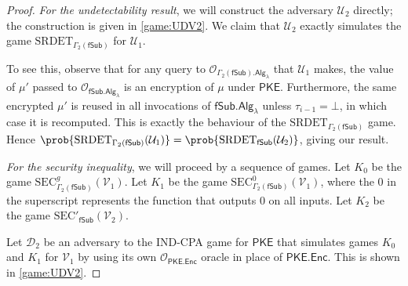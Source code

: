 \begin{proof}
\textit{For the undetectability result}, we will construct the adversary $\mathcal{U}_2$ directly; the construction is given in \autoref{game:UDV2}. We claim that $\mathcal{U}_2$ exactly simulates the game $\mathrm{SRDET}_{\Gamma_2(\mathsf{fSub})}$ for $\mathcal{U}_1$.

To see this, observe that for any query to $\mathcal{O}_{\Gamma_2(\mathsf{fSub}).\mathsf{Alg}_\lambda}$ that $\mathcal{U}_1$ makes, the value of $\mu'$ passed to $\mathcal{O}_{\mathsf{fSub.Alg}_\lambda}$ is an encryption of $\mu$ under $\mathsf{PKE}$. Furthermore, the same encrypted $\mu'$ is reused in all invocations of $\mathsf{fSub.Alg}_\lambda$ unless $\tau_{i-1}=\bot$, in which case it is recomputed. This is exactly the behaviour of the $\mathrm{SRDET}_{\Gamma_2(\mathsf{fSub})}$ game. Hence $\prob{\mathrm{SRDET}_{\Gamma_2(\mathsf{fSub})}(\mathcal{U}_1)}=\prob{\mathrm{SRDET}_{\mathsf{fSub}}(\mathcal{U}_2)}$, giving our result.

\textit{For the security inequality}, we will proceed by a sequence of games. Let $K_0$ be the game $\mathrm{SEC}^g_{\Gamma_2(\mathsf{fSub})}(\mathcal{V}_1)$. Let $K_1$ be the game $\mathrm{SEC}^0_{\Gamma_2(\mathsf{fSub})}(\mathcal{V}_1)$, where the 0 in the superscript represents the function that outputs 0 on all inputs. Let $K_2$ be the game $\mathrm{SEC'}_{\mathsf{fSub}}(\mathcal{V}_2)$.

Let $\mathcal{D}_2$ be an adversary to the IND-CPA game for $\mathsf{PKE}$ that simulates games $K_0$ and $K_1$ for $\mathcal{V}_1$ by using its own $\mathcal{O}_\mathsf{PKE.Enc}$ oracle in place of $\mathsf{PKE.Enc}$. This is shown in \autoref{game:UDV2}.


\end{proof}
